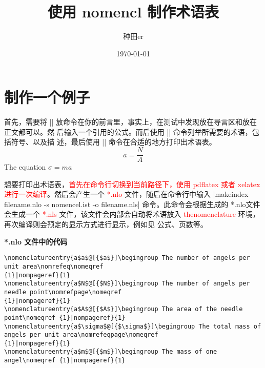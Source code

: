 \documentclass{ctexart}
\newcommand{\txr}[1]{\textcolor{red}{#1}}
\begin{document}
 
\title{使用 nomencl 制作术语表}	
\date{\today} 
\author{种田er}
\maketitle
 
\section{制作一个例子}

\par 
首先，需要将 |\makenomenclature| 放命令在你的前言里，事实上，在测试中发现放在导言区和放在正文都可以。然
后输入一个引用的公式。而后使用 || 命令列举所需要的术语，包括符号、以及描
述，最后使用 |\printnomenclature| 命令在合适的地方打印出术语表。
\begin{equation}
	a=\frac{N}{A}
\end{equation}%
%
%
%
The equation $\sigma = m a$%
%


\par 
想要打印出术语表，\txr{首先在命令行切换到当前路径下，使用 pdflatex 或者 xelatex 进行一次编译}。然后会产生一个 
\txr{*.nlo} 文件，随后在命令行中输入 |makeindex filename.nlo -s nomencel.ist -o filename.nls| 命令。此命令会根据生成的 *.nlo文件
会生成一个  \txr{*.nls} 文件，该文件会内部会自动将术语放入 \txr{thenomenclature} 
环境，再次编译则会预定的显示方式进行显示，例如见 公式、页数等。

\noindent \textbf{*.nlo 文件中的代码}
\begin{lstlisting} 
\nomenclatureentry{a$a$@[{$a$}]\begingroup The number of angels per unit area\nomrefeq\nomeqref 
{1}|nompageref}{1}
\nomenclatureentry{a$N$@[{$N$}]\begingroup The number of angels per needle point\nomrefpage\nomeqref 
{1}|nompageref}{1}
\nomenclatureentry{a$A$@[{$A$}]\begingroup The area of the needle point\nomeqref {1}|nompageref}{1}
\nomenclatureentry{a$\sigma$@[{$\sigma$}]\begingroup The total mass of angels per unit area\nomrefeqpage\nomeqref 
{1}|nompageref}{1}
\nomenclatureentry{a$m$@[{$m$}]\begingroup The mass of one angel\nomeqref {1}|nompageref}{1}
\end{lstlisting} 
\end{document}

